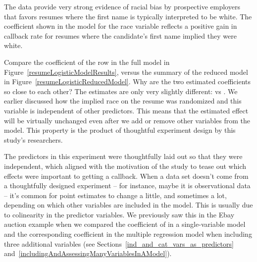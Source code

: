 The data provide very strong evidence of racial bias
by prospective employers that favors resumes where the
first name is typically interpreted to be white.
The coefficient shown in the model for the
race variable reflects a positive gain in callback
rate for resumes where the candidate's first name
implied they were white.

\begin{examplewrap}
\begin{nexample}{Compare the coefficient of the
     row in the full model in
    Figure~\ref{resumeLogisticModelResults},
    versus the summary of the reduced model in
    Figure~\ref{resumeLogisticReducedModel}.
    Why are the two estimated coefficients so
    close to each other?}
  The estimates are only very slightly different:
  \resRaceWhiteCoefReduced{} vs \resRaceWhiteCoef{}.
  We earlier discussed how the implied race on the resume
  was randomized and this variable is independent of
  other predictors.
  This means that the estimated effect will be virtually
  unchanged even after we add or remove other variables
  from the model.
  This property is the product of thoughtful experiment
  design by this study's researchers.
\end{nexample}
\end{examplewrap}

The predictors in this experiment were thoughtfully
laid out so that they were independent,
which aligned with the motivation of the study to tease
out which effects were important to getting a callback.
When a data set doesn't come from a thoughtfully designed
experiment -- for instance, maybe it is observational data --
it's common for point estimates to change a little,
and sometimes a lot, depending on which other
variables are included in the model.
This is usually due to colinearity in the predictor variables.
We previously saw this in the Ebay auction example when
we compared the coefficient of  in a
single-variable model and the corresponding coefficient
in the multiple regression model when including three
additional variables (see
Sections~\ref{ind_and_cat_vars_as_predictors}
and~\ref{includingAndAssessingManyVariablesInAModel}).

